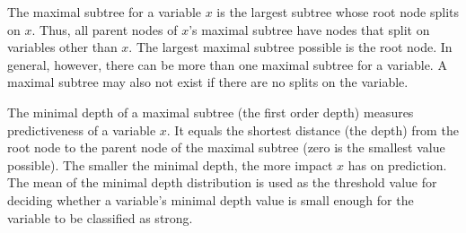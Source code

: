 \documentclass[nojss]{jss}\usepackage[]{graphicx}\usepackage[]{color}
\begin{document}
The maximal subtree for a variable $x$ is the largest subtree whose root node splits on $x$. Thus, all parent nodes of $x$'s maximal subtree have nodes that split on variables other than $x$. The largest maximal subtree possible is the root node. In general, however, there can be more than one maximal subtree for a variable. A maximal subtree may also not exist if there are no splits on the variable.

The minimal depth of a maximal subtree (the first order depth) measures predictiveness of a variable $x$. It equals the shortest distance (the depth) from the root node to the parent node of the maximal subtree (zero is the smallest value possible). The smaller the minimal depth, the more impact $x$ has on prediction. The mean of the minimal depth distribution is used as the threshold value for deciding whether a variable's minimal depth value is small enough for the variable to be classified as strong. 
\end{document}
